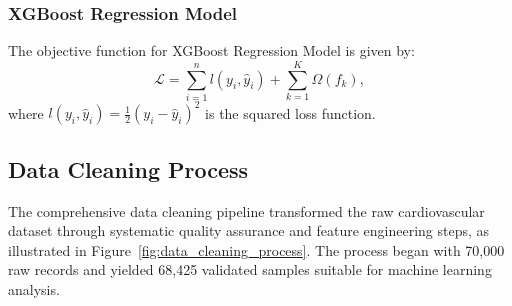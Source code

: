 \documentclass[conference]{IEEEtran}
\begin{document}
\subsubsection{XGBoost Regression Model}
The objective function for XGBoost Regression Model is given by:
\begin{equation}\label{eq:XGBoostRegObjective}
\mathcal{L} = \sum_{i=1}^{n} l(y_i, \hat{y}_i) + \sum_{k=1}^{K} \Omega(f_k),
\end{equation}
where $l(y_i, \hat{y}_i) = \frac{1}{2}(y_i - \hat{y}_i)^2$ is the squared loss function.

\subsection{Data Cleaning Process}
\label{sec:data_cleaning}

The comprehensive data cleaning pipeline transformed the raw cardiovascular dataset through systematic quality assurance and feature engineering steps, as illustrated in Figure~\ref{fig:data_cleaning_process}. The process began with 70,000 raw records and yielded 68,425 validated samples suitable for machine learning analysis.
\end{document}

